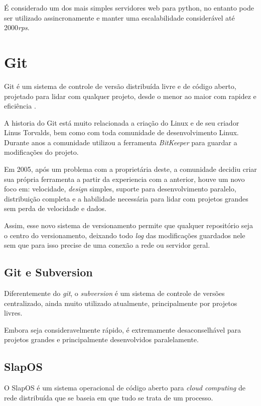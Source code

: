 É considerado um dos mais simples servidores web para python, no entanto pode ser utilizado assincronamente e manter uma escalabilidade considerável até 2000\textit{rps}.

\section{Git}

Git é um sistema de controle de versão distribuída livre e de código aberto, projetado para lidar com qualquer projeto, desde o menor ao maior com rapidez e eficiência \cite{SOFTWARE-FREEDOM-CONSERVANCY}.

A historia do Git está muito relacionada a criação do Linux e de seu criador Linus Torvalds, bem como com toda comunidade de desenvolvimento Linux. Durante anos a comunidade utilizou a ferramenta \textit{BitKeeper} para guardar a modificações do projeto.

Em 2005, após um problema com a proprietária deste, a comunidade decidiu criar sua própria ferramenta a partir da experiencia com a anterior, houve um novo foco em: velocidade, \textit{design} simples, suporte para desenvolvimento paralelo, distribuição completa e a habilidade necessária para lidar com projetos grandes sem perda de velocidade e dados.

Assim, esse novo sistema de versionamento permite que qualquer repositório seja o centro do versionamento, deixando todo \textit{log} das modificações guardados nele sem que para isso precise de uma conexão a rede ou servidor geral.

\subsection{Git e Subversion}

Diferentemente do \textit{git}, o \textit{subversion} é um sistema de controle de versões centralizado, ainda muito utilizado atualmente, principalmente por projetos livres.

Embora seja consideravelmente rápido, é extremamente desaconselhável para projetos grandes e principalmente desenvolvidos paralelamente.

\subsection{SlapOS}

O SlapOS é um sistema operacional de código aberto para \textit{cloud computing} de rede distribuída que se baseia em que tudo se trata de um processo.


